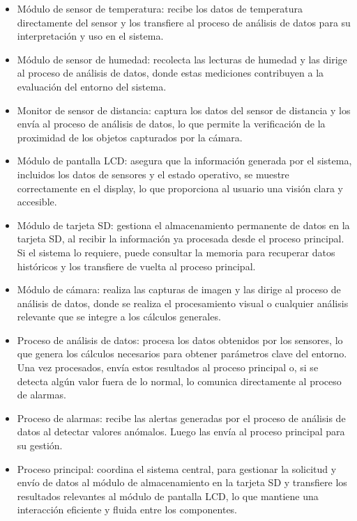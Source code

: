 \begin{itemize}
\item Módulo de sensor de temperatura: recibe los datos de temperatura directamente del sensor y los transfiere al proceso de análisis de datos para su interpretación y uso en el sistema.
\item Módulo de sensor de humedad: recolecta las lecturas de humedad y las dirige al proceso de análisis de datos, donde estas mediciones contribuyen a la evaluación del entorno del sistema.
\item Monitor de sensor de distancia: captura los datos del sensor de distancia y los envía al proceso de análisis de datos, lo que permite la verificación de la proximidad de los objetos capturados por la cámara.
\item Módulo de pantalla LCD: asegura que la información generada por el sistema, incluidos los datos de sensores y el estado operativo, se muestre correctamente en el display, lo que proporciona al usuario una visión clara y accesible.
\item Módulo de tarjeta SD: gestiona el almacenamiento permanente de datos en la tarjeta SD, al recibir la información ya procesada desde el proceso principal. Si el sistema lo requiere, puede consultar la memoria para recuperar datos históricos y los transfiere de vuelta al proceso principal.
\item Módulo de cámara: realiza las capturas de imagen y las dirige al proceso de análisis de datos, donde se realiza el procesamiento visual o cualquier análisis relevante que se integre a los cálculos generales.
\item Proceso de análisis de datos: procesa los datos obtenidos por los sensores, lo que genera los cálculos necesarios para obtener parámetros clave del entorno. Una vez procesados, envía estos resultados al proceso principal o, si se detecta algún valor fuera de lo normal, lo comunica directamente al proceso de alarmas.
\item Proceso de alarmas: recibe las alertas generadas por el proceso de análisis de datos al detectar valores anómalos. Luego las envía al proceso principal para su gestión.
\item Proceso principal: coordina el sistema central, para gestionar la solicitud y envío de datos al módulo de almacenamiento en la tarjeta SD y transfiere los resultados relevantes al módulo de pantalla LCD, lo que mantiene una interacción eficiente y fluida entre los componentes.
\end{itemize}

